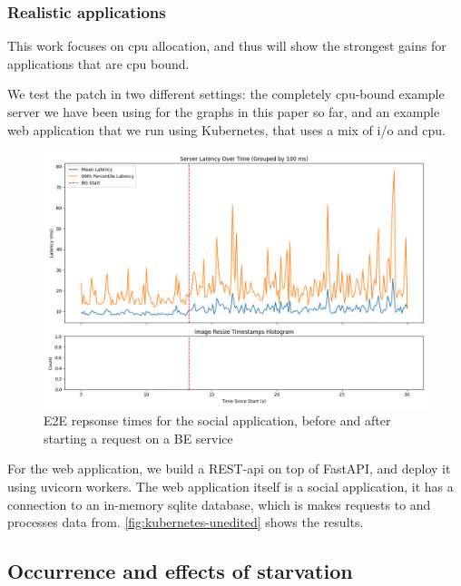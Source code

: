 \subsubsection{Realistic applications}

This work focuses on cpu allocation, and thus will show the strongest gains for
applications that are cpu bound. 

We test the patch in two different settings: the completely cpu-bound example
server we have been using for the graphs in this paper so far, and an example
web application that we run using Kubernetes, that uses a mix of i/o and cpu.

\begin{figure}[t]
    \centering
    \includegraphics[width=\columnwidth]{graphs/kubernetes-unedited.png}
    \caption{E2E repsonse times for the social application, before and after
    starting a request on a BE service}\label{fig:kubernetes-unedited}
\end{figure}

For the web application, we build a REST-api on top of FastAPI, and deploy it
using uvicorn workers. The web application itself is a social application, it
has a connection to an in-memory sqlite database, which is makes requests to and
processes data from. \autoref{fig:kubernetes-unedited} shows the results.

\subsection{Occurrence and effects of starvation}






